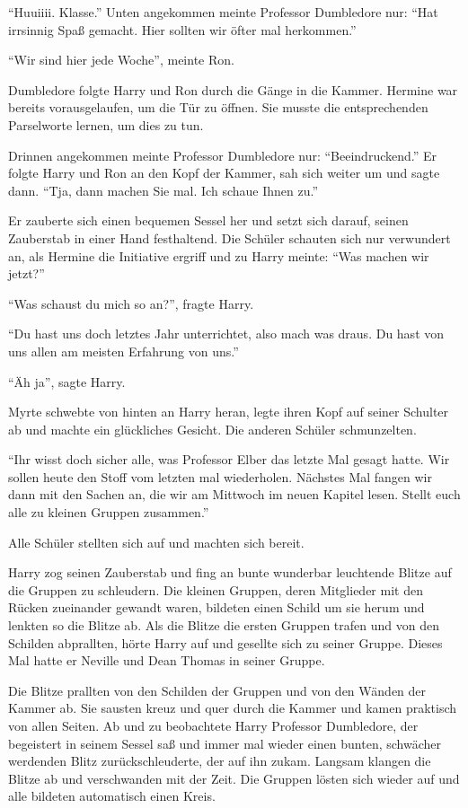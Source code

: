 \enquote{Huuiiii. Klasse.} Unten angekommen meinte Professor Dumbledore nur: \enquote{Hat irrsinnig Spaß gemacht. Hier sollten wir öfter mal herkommen.}

\enquote{Wir sind hier jede Woche}, meinte Ron.

Dumbledore folgte Harry und Ron durch die Gänge in die Kammer. Hermine war bereits vorausgelaufen, um die Tür zu öffnen. Sie musste die entsprechenden Parselworte lernen, um dies zu tun.

Drinnen angekommen meinte Professor Dumbledore nur: \enquote{Beeindruckend.} Er folgte Harry und Ron an den Kopf der Kammer, sah sich weiter um und sagte dann. \enquote{Tja, dann machen Sie mal. Ich schaue Ihnen zu.}

Er zauberte sich einen bequemen Sessel her und setzt sich darauf, seinen Zauberstab in einer Hand festhaltend. Die Schüler schauten sich nur verwundert an, als Hermine die Initiative ergriff und zu Harry meinte: \enquote{Was machen wir jetzt?}

\enquote{Was schaust du mich so an?}, fragte Harry.

\enquote{Du hast uns doch letztes Jahr unterrichtet, also mach was draus. Du hast von uns allen am meisten Erfahrung von uns.}

\enquote{Äh ja}, sagte Harry.

Myrte schwebte von hinten an Harry heran, legte ihren Kopf auf seiner Schulter ab und machte ein glückliches Gesicht. Die anderen Schüler schmunzelten.

\enquote{Ihr wisst doch sicher alle, was Professor Elber das letzte Mal gesagt hatte. Wir sollen heute den Stoff vom letzten mal wiederholen. Nächstes Mal fangen wir dann mit den Sachen an, die wir am Mittwoch im neuen Kapitel lesen. Stellt euch alle zu kleinen Gruppen zusammen.}

Alle Schüler stellten sich auf und machten sich bereit.

Harry zog seinen Zauberstab und fing an bunte wunderbar leuchtende Blitze auf die Gruppen zu schleudern. Die kleinen Gruppen, deren Mitglieder mit den Rücken zueinander gewandt waren, bildeten einen Schild um sie herum und lenkten so die Blitze ab. Als die Blitze die ersten Gruppen trafen und von den Schilden abprallten, hörte Harry auf und gesellte sich zu seiner Gruppe. Dieses Mal hatte er Neville und Dean Thomas in seiner Gruppe.

Die Blitze prallten von den Schilden der Gruppen und von den Wänden der Kammer ab. Sie sausten kreuz und quer durch die Kammer und kamen praktisch von allen Seiten. Ab und zu beobachtete Harry Professor Dumbledore, der begeistert in seinem Sessel saß und immer mal wieder einen bunten, schwächer werdenden Blitz zurückschleuderte, der auf ihn zukam. Langsam klangen die Blitze ab und verschwanden mit der Zeit. Die Gruppen lösten sich wieder auf und alle bildeten automatisch einen Kreis.

